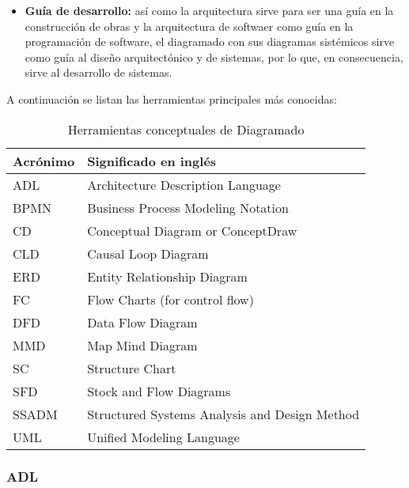 \begin{itemize}
\item \textbf{Guía de desarrollo:} así como la arquitectura sirve para ser una guía en la construcción de obras y la arquitectura de softwaer como guía en la programación de software, el diagramado con sus diagramas sistémicos sirve como guía al diseño arquitectónico y de sistemas, por lo que, en consecuencia, sirve al desarrollo de sistemas.

\end{itemize}

A continuación se listan las herramientas principales más conocidas:

\begin{table}[h]
\centering
\caption{Herramientas conceptuales de Diagramado}
\label{Herramientas-conceptuales-de-Diagramado}
\begin{tabular}{|l|l|}
\hline
Acrónimo & Significado en inglés                         \\ \hline
ADL      & Architecture Description Language             \\ \hline
BPMN     & Business Process Modeling Notation            \\ \hline
CD       & Conceptual Diagram or ConceptDraw             \\ \hline
CLD      & Causal Loop Diagram                           \\ \hline
ERD      & Entity Relationship Diagram                   \\ \hline
FC       & Flow Charts (for control flow)                \\ \hline
DFD      & Data Flow Diagram                             \\ \hline
MMD      & Map Mind Diagram                              \\ \hline
SC       & Structure Chart                               \\ \hline
SFD      & Stock and Flow Diagrams                       \\ \hline
SSADM    & Structured Systems Analysis and Design Method \\ \hline
UML      & Unified Modeling Language                     \\ \hline
\end{tabular}
\end{table}

\subsubsection{ADL}

